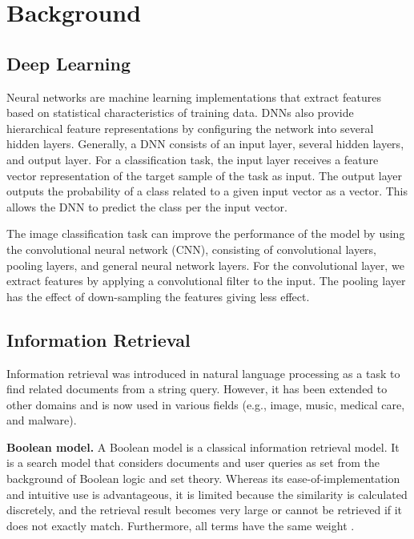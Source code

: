 \section{Background}

\subsection{Deep Learning }

Neural networks are machine learning implementations that extract features based on statistical characteristics of training data. DNNs also provide hierarchical feature representations by configuring the network into several hidden layers. Generally, a DNN consists of an input layer, several hidden layers, and output layer. For a classification task, the input layer receives a feature vector representation of the target sample of the task as input. The output layer outputs the probability of a class related to a given input vector as a vector. This allows the DNN to predict the class per the input vector.
 
The image classification task can improve the performance of the model by using the convolutional neural network (CNN)\cite{krizhevsky2012imagenet}, consisting of convolutional layers, pooling layers, and general neural network layers. For the convolutional layer, we extract features by applying a convolutional filter to the input. The pooling layer has the effect of down-sampling the features giving less effect.




\subsection{Information Retrieval}
Information retrieval was introduced in natural language processing as a task to find related documents from a string query. However, it has been extended to other domains and is now used in various fields (e.g., image\cite{datta2008image, yu2015learning}, music\cite{schedl2014music}, medical care\cite{goeuriot2016medical, mourao2015multimodal}, and malware\cite{santos2013noa}).

\textbf{Boolean model.} A Boolean model is a classical information retrieval model. It is a search model that considers documents and user queries as set from the background of Boolean logic and set theory. Whereas its ease-of-implementation and intuitive use is advantageous, it is limited because the similarity is calculated discretely, and the retrieval result becomes very large or cannot be retrieved if it does not exactly match. Furthermore, all terms have the same weight\cite{lashkari2009boolean} .
	


